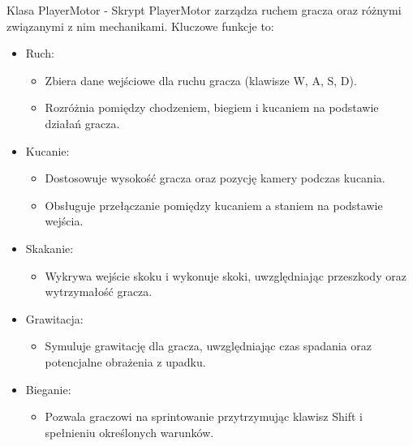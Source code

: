 Klasa PlayerMotor -
Skrypt PlayerMotor zarządza ruchem gracza oraz różnymi związanymi z nim mechanikami. Kluczowe funkcje to:
\begin{itemize}
  \item Ruch:
    \begin{itemize}
      \item Zbiera dane wejściowe dla ruchu gracza (klawisze W, A, S, D).
      \item Rozróżnia pomiędzy chodzeniem, biegiem i kucaniem na podstawie działań gracza.
    \end{itemize}
  \item Kucanie:
    \begin{itemize}
      \item Dostosowuje wysokość gracza oraz pozycję kamery podczas kucania.
      \item Obsługuje przełączanie pomiędzy kucaniem a staniem na podstawie wejścia.
    \end{itemize}
  \item Skakanie:
    \begin{itemize}
      \item Wykrywa wejście skoku i wykonuje skoki, uwzględniając przeszkody oraz wytrzymałość gracza.
    \end{itemize}
  \item Grawitacja:
    \begin{itemize}
      \item Symuluje grawitację dla gracza, uwzględniając czas spadania oraz potencjalne obrażenia z upadku.
    \end{itemize}
  \item Bieganie:
    \begin{itemize}
      \item Pozwala graczowi na sprintowanie przytrzymując klawisz Shift i spełnieniu określonych warunków.
    \end{itemize}
\end{itemize}

